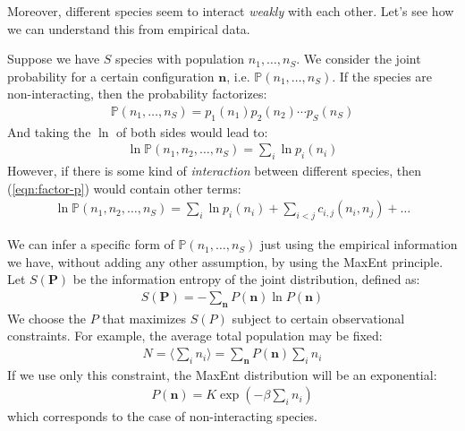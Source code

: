 \documentclass[../../main.tex]{subfiles}
\begin{document}


Moreover, different species seem to interact \textit{weakly} with each other. Let's see how we can understand this from empirical data.

\medskip

Suppose we have $S$ species with population $n_1, \dots, n_S$. We consider the joint probability for a certain configuration $\bm{n}$, i.e. $\mathbb{P}(n_1, \dots, n_S)$. If the species are non-interacting, then the probability factorizes:
\begin{align*}
    \mathbb{P}(n_1, \dots, n_S) = p_1(n_1) p_2(n_2) \cdots p_S(n_S)
\end{align*}
And taking the $\ln$ of both sides would lead to:
\begin{align}\label{eqn:factor-p}
    \ln \mathbb{P}(n_1, n_2, \dots, n_S) = \sum_i \ln p_i(n_i)
\end{align}
However, if there is some kind of \textit{interaction} between different species, then (\ref{eqn:factor-p}) would contain other terms:
\begin{align*}
    \ln \mathbb{P}(n_1, n_2, \dots, n_S) = \sum_i \ln p_i(n_i) + \sum_{i < j} c_{i,j}(n_i, n_j) + \dots
\end{align*}

We can infer a specific form of $\mathbb{P}(n_1, \dots, n_S)$ just using the empirical information we have, without adding any other assumption, by using the MaxEnt principle. Let $S(\bm{P})$ be the information entropy of the joint distribution, defined as:
\begin{align*}
    S(\bm{P}) = - \sum_{\bm{n}} P(\bm{n}) \ln P(\bm{n})
\end{align*}
We choose the $P$ that maximizes $S(P)$ subject to certain observational constraints. For example, the average total population may be fixed:
\begin{align*}
    N = \langle \sum_i n_i \rangle = \sum_{\bm{n}} P(\bm{n}) \sum_i n_i
\end{align*}
If we use only this constraint, the MaxEnt distribution will be an exponential:
\begin{align*}
    P(\bm{n}) = K \exp(-\beta \sum_i n_i)
\end{align*}
which corresponds to the case of non-interacting species.
\end{document}

